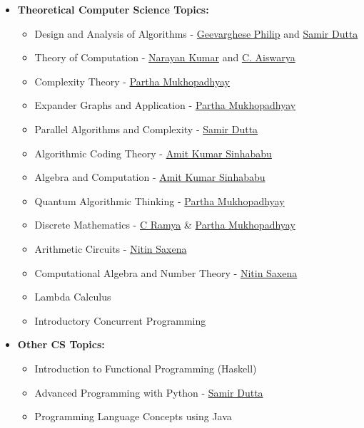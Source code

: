 \documentclass[10pt,a4paper,sans,colorlinks]{moderncv}        %
\begin{document}
\begin{itemize}
\begin{itemize}

		      \item \textbf{Theoretical Computer Science Topics:} \begin{itemize}
			            \item Design and Analysis of Algorithms - \href{https://www.cmi.ac.in/~gphilip/}{Geevarghese Philip} and \href{https://www.cmi.ac.in/~sdatta/}{Samir Dutta}
			            \item Theory of Computation - \href{https://www.cmi.ac.in/~kumar/}{Narayan Kumar} and \href{https://www.cmi.ac.in/~aiswarya/}{C. Aiswarya}
			            \item Complexity Theory - \href{https://www.cmi.ac.in/~partham/}{Partha Mukhopadhyay}
			             \item Expander Graphs and Application - \href{https://www.cmi.ac.in/~partham/}{Partha Mukhopadhyay}
			            \item Parallel Algorithms and Complexity - \href{https://www.cmi.ac.in/~sdatta/}{Samir Dutta}
			            \item Algorithmic Coding Theory - \href{https://www.cmi.ac.in/people/fac-profile.php?id=amitks}{Amit Kumar Sinhababu}
			            \item Algebra and Computation - \href{https://www.cmi.ac.in/people/fac-profile.php?id=amitks}{Amit Kumar Sinhababu}
			            \item Quantum Algorithmic Thinking - \href{https://www.cmi.ac.in/~partham/}{Partha Mukhopadhyay}
			            \item Discrete Mathematics - \href{https://sites.google.com/cse.iitm.ac.in/c-ramya}{C Ramya} \& \href{https://www.cmi.ac.in/~partham/}{Partha Mukhopadhyay}
			            \item Arithmetic Circuits - \href{https://www.cse.iitk.ac.in/users/nitin/}{Nitin Saxena}
			            \item Computational Algebra and Number Theory - \href{https://www.cse.iitk.ac.in/users/nitin/}{Nitin Saxena}
			            \item Lambda Calculus
			            \item Introductory Concurrent Programming
		            \end{itemize}
		            \vspace*{5mm}
		      \item \textbf{Other CS Topics:} \begin{itemize}
			            \item Introduction to Functional Programming (Haskell)
			            \item Advanced Programming with Python - \href{https://www.cmi.ac.in/~sdatta/}{Samir Dutta}
			            \item Programming Language Concepts using Java
		            \end{itemize}



\end{itemize}
\end{itemize}
\end{document}
